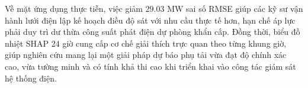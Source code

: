 Về mặt ứng dụng thực tiễn, việc giảm $29.03\text{ MW}$ sai số RMSE giúp các kỹ sư vận hành lưới điện lập kế hoạch điều độ sát với nhu cầu thực tế hơn, hạn chế áp lực phải duy trì dư thừa công suất phát điện dự phòng khẩn cấp. Đồng thời, biểu đồ nhiệt SHAP 24 giờ cung cấp cơ chế giải thích trực quan theo từng khung giờ, giúp nghiên cứu mang lại một giải pháp dự báo phụ tải vừa đạt độ chính xác cao, vừa tường minh và có tính khả thi cao khi triển khai vào công tác giám sát hệ thống điện.